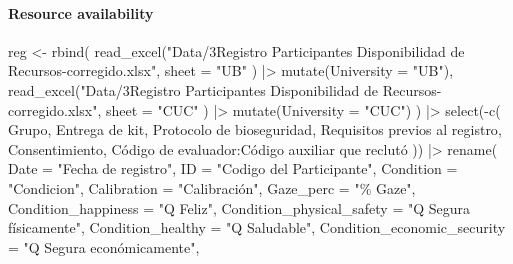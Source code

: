 \documentclass[
  bookmarksnumbered]{article}
\newenvironment{Shaded}{\begin{snugshade}}{\end{snugshade}}
\newcommand{\AttributeTok}[1]{\textcolor[rgb]{0.80,0.80,0.80}{#1}}
\newcommand{\FunctionTok}[1]{\textcolor[rgb]{0.94,0.94,0.56}{#1}}
\newcommand{\NormalTok}[1]{\textcolor[rgb]{0.80,0.80,0.80}{#1}}
\newcommand{\OtherTok}[1]{\textcolor[rgb]{0.94,0.94,0.56}{#1}}
\newcommand{\SpecialCharTok}[1]{\textcolor[rgb]{0.86,0.64,0.64}{#1}}
\newcommand{\StringTok}[1]{\textcolor[rgb]{0.80,0.58,0.58}{#1}}
\begin{document}
\paragraph{Resource availability}\label{resource-availability}

\begin{Shaded}
\begin{Highlighting}[]
\NormalTok{reg }\OtherTok{\textless{}{-}} \FunctionTok{rbind}\NormalTok{(}
  \FunctionTok{read\_excel}\NormalTok{(}\StringTok{"Data/3Registro Participantes Disponibilidad de Recursos{-}corregido.xlsx"}\NormalTok{,}
    \AttributeTok{sheet =} \StringTok{"UB"}
\NormalTok{  ) }\SpecialCharTok{|\textgreater{}}
    \FunctionTok{mutate}\NormalTok{(}\AttributeTok{University =} \StringTok{"UB"}\NormalTok{),}
  \FunctionTok{read\_excel}\NormalTok{(}\StringTok{"Data/3Registro Participantes Disponibilidad de Recursos{-}corregido.xlsx"}\NormalTok{,}
    \AttributeTok{sheet =} \StringTok{"CUC"}
\NormalTok{  ) }\SpecialCharTok{|\textgreater{}}
    \FunctionTok{mutate}\NormalTok{(}\AttributeTok{University =} \StringTok{"CUC"}\NormalTok{)}
\NormalTok{) }\SpecialCharTok{|\textgreater{}}
  \FunctionTok{select}\NormalTok{(}\SpecialCharTok{{-}}\FunctionTok{c}\NormalTok{(}
\NormalTok{    Grupo, }\StringTok{\textasciigrave{}}\AttributeTok{Entrega de kit}\StringTok{\textasciigrave{}}\NormalTok{, }\StringTok{\textasciigrave{}}\AttributeTok{Protocolo de bioseguridad}\StringTok{\textasciigrave{}}\NormalTok{, }\StringTok{\textasciigrave{}}\AttributeTok{Requisitos previos al registro}\StringTok{\textasciigrave{}}\NormalTok{, }
\NormalTok{    Consentimiento, }\StringTok{\textasciigrave{}}\AttributeTok{Código de evaluador}\StringTok{\textasciigrave{}}\SpecialCharTok{:}\StringTok{\textasciigrave{}}\AttributeTok{Código auxiliar que reclutó}\StringTok{\textasciigrave{}}
\NormalTok{  )) }\SpecialCharTok{|\textgreater{}}
  \FunctionTok{rename}\NormalTok{(}
    \AttributeTok{Date =} \StringTok{"Fecha de registro"}\NormalTok{,}
    \AttributeTok{ID =} \StringTok{"Codigo del Participante"}\NormalTok{,}
    \AttributeTok{Condition =} \StringTok{"Condicion"}\NormalTok{,}
    \AttributeTok{Calibration =} \StringTok{"Calibración"}\NormalTok{,}
    \AttributeTok{Gaze\_perc =} \StringTok{"\% Gaze"}\NormalTok{,}
    \AttributeTok{Condition\_happiness =} \StringTok{"Q Feliz"}\NormalTok{,}
    \AttributeTok{Condition\_physical\_safety =} \StringTok{"Q Segura físicamente"}\NormalTok{,}
    \AttributeTok{Condition\_healthy =} \StringTok{"Q Saludable"}\NormalTok{,}
    \AttributeTok{Condition\_economic\_security =} \StringTok{"Q Segura económicamente"}\NormalTok{,}

\end{Highlighting}
\end{Shaded}
\end{document}
